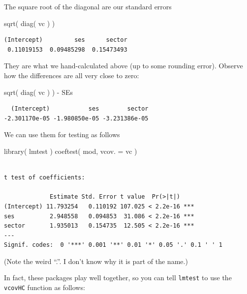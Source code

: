 \documentclass[
  letterpaper,
  DIV=11,
  numbers=noendperiod]{scrreprt}
\newenvironment{Shaded}{}{}
\newcommand{\AttributeTok}[1]{\textcolor[rgb]{0.49,0.56,0.16}{#1}}
\newcommand{\FunctionTok}[1]{\textcolor[rgb]{0.02,0.16,0.49}{#1}}
\newcommand{\NormalTok}[1]{#1}
\newcommand{\SpecialCharTok}[1]{\textcolor[rgb]{0.25,0.44,0.63}{#1}}
\begin{document}
The square root of the diagonal are our standard errors

\begin{Shaded}
\begin{Highlighting}[]
\FunctionTok{sqrt}\NormalTok{( }\FunctionTok{diag}\NormalTok{( vc ) )}
\end{Highlighting}
\end{Shaded}

\begin{verbatim}
(Intercept)         ses      sector 
 0.11019153  0.09485298  0.15473493 
\end{verbatim}

They are what we hand-calculated above (up to some rounding error).
Observe how the differences are all very close to zero:

\begin{Shaded}
\begin{Highlighting}[]
\FunctionTok{sqrt}\NormalTok{( }\FunctionTok{diag}\NormalTok{( vc ) ) }\SpecialCharTok{{-}}\NormalTok{ SEs}
\end{Highlighting}
\end{Shaded}

\begin{verbatim}
  (Intercept)           ses        sector 
-2.301170e-05 -1.980850e-05 -3.231386e-05 
\end{verbatim}

We can use them for testing as follows

\begin{Shaded}
\begin{Highlighting}[]
\FunctionTok{library}\NormalTok{( lmtest )}
\FunctionTok{coeftest}\NormalTok{( mod, }\AttributeTok{vcov. =}\NormalTok{ vc )}
\end{Highlighting}
\end{Shaded}

\begin{verbatim}

t test of coefficients:

             Estimate Std. Error t value  Pr(>|t|)    
(Intercept) 11.793254   0.110192 107.025 < 2.2e-16 ***
ses          2.948558   0.094853  31.086 < 2.2e-16 ***
sector       1.935013   0.154735  12.505 < 2.2e-16 ***
---
Signif. codes:  0 '***' 0.001 '**' 0.01 '*' 0.05 '.' 0.1 ' ' 1
\end{verbatim}

(Note the weird ``.''. I don't know why it is part of the name.)

In fact, these packages play well together, so you can tell
\texttt{lmtest} to use the \texttt{vcovHC} function as follows:
\end{document}

